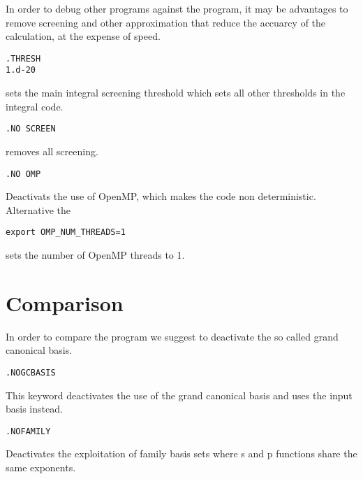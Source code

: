 In order to debug other programs against the {\lsdalton} program, it may be advantages to remove screening and other approximation that reduce the accuarcy of the calculation, at the expense of speed.

\begin{verbatim}
.THRESH
1.d-20
\end{verbatim}
sets the main integral screening threshold which sets all other thresholds in the integral code. 
\begin{verbatim}
.NO SCREEN
\end{verbatim}
removes all screening. 
\begin{verbatim}
.NO OMP 
\end{verbatim}
Deactivats the use of OpenMP, which makes the code non deterministic. Alternative the 
\begin{verbatim}
export OMP_NUM_THREADS=1
\end{verbatim}
sets the number of OpenMP threads to 1.

\section{Comparison}

In order to compare the {\lsdalton} program
we suggest to deactivate the so called grand canonical basis. 
\begin{verbatim}
.NOGCBASIS
\end{verbatim}
This keyword deactivates the use of the grand canonical basis and uses the input basis instead. 
\begin{verbatim}
.NOFAMILY
\end{verbatim}
Deactivates the exploitation of family basis sets where s and p functions share the same exponents. 






